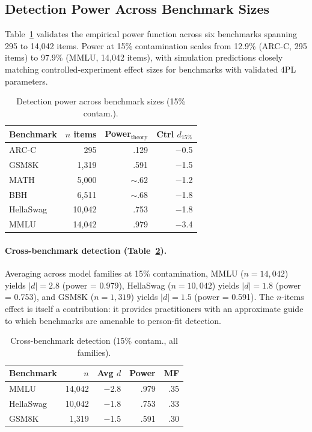 \documentclass[11pt,twocolumn]{article}
\begin{document}
\subsection{Detection Power Across Benchmark Sizes}

Table~\ref{tab:power} validates the empirical power function across six benchmarks spanning 295 to 14,042 items. Power at 15\% contamination scales from 12.9\% (ARC-C, 295 items) to 97.9\% (MMLU, 14,042 items), with simulation predictions closely matching controlled-experiment effect sizes for benchmarks with validated 4PL parameters.

\begin{table}[t]
\centering
\caption{Detection power across benchmark sizes (15\% contam.).}
\label{tab:power}
\footnotesize
\begin{tabular}{lrrr}
\toprule
Benchmark & $n$ items & Power$_{\text{theory}}$ & Ctrl $d_{15\%}$ \\
\midrule
ARC-C & 295 & .129 & $-$0.5 \\
GSM8K & 1,319 & .591 & $-$1.5 \\
MATH & 5,000 & $\sim$.62 & $-$1.2 \\
BBH & 6,511 & $\sim$.68 & $-$1.8 \\
HellaSwag & 10,042 & .753 & $-$1.8 \\
MMLU & 14,042 & .979 & $-$3.4 \\
\bottomrule
\end{tabular}
\vspace{-0.3cm}
\end{table}

\paragraph{Cross-benchmark detection (Table~\ref{tab:cross_bench}).} Averaging across model families at 15\% contamination, MMLU ($n = 14{,}042$) yields $|d| = 2.8$ (power = 0.979), HellaSwag ($n = 10{,}042$) yields $|d| = 1.8$ (power = 0.753), and GSM8K ($n = 1{,}319$) yields $|d| = 1.5$ (power = 0.591). The $n$-items effect is itself a contribution: it provides practitioners with an approximate guide to which benchmarks are amenable to person-fit detection.

\begin{table}[t]
\centering
\caption{Cross-benchmark detection (15\% contam., all families).}
\label{tab:cross_bench}
\footnotesize
\begin{tabular}{lrrrr}
\toprule
Benchmark & $n$ & Avg $d$ & Power & MF \\
\midrule
MMLU & 14,042 & $-$2.8 & .979 & .35 \\
HellaSwag & 10,042 & $-$1.8 & .753 & .33 \\
GSM8K & 1,319 & $-$1.5 & .591 & .30 \\
\bottomrule
\end{tabular}
\vspace{-0.3cm}
\end{table}
\end{document}
